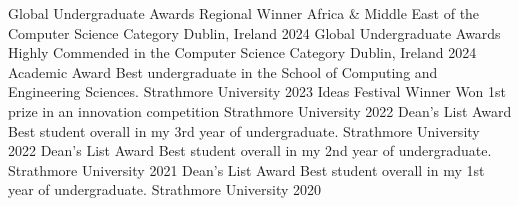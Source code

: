 


\begin{cvhonors}

  \cvhonor
    {Global Undergraduate Awards Regional Winner} %
    {Africa \& Middle East of the Computer Science Category} %
    {Dublin, Ireland} %
    {2024} %
  \cvhonor
    {Global Undergraduate Awards Highly Commended} %
    {in the Computer Science Category} %
    {Dublin, Ireland} %
    {2024} %
  \cvhonor
    {Academic Award} %
    {Best undergraduate in the School of Computing and Engineering Sciences.} %
    {Strathmore University} %
    {2023} %
  \cvhonor
    {Ideas Festival Winner} %
    {Won 1st prize in an innovation competition} %
    {Strathmore University} %
    {2022} %
  \cvhonor
    {Dean's List Award} %
    {Best student overall in my 3rd year of undergraduate.} %
    {Strathmore University} %
    {2022} %
  \cvhonor
    {Dean's List Award} %
    {Best student overall in my 2nd year of undergraduate.} %
    {Strathmore University} %
    {2021} %
  \cvhonor
    {Dean's List Award} %
    {Best student overall in my 1st year of undergraduate.} %
    {Strathmore University} %
    {2020} %
\end{cvhonors}